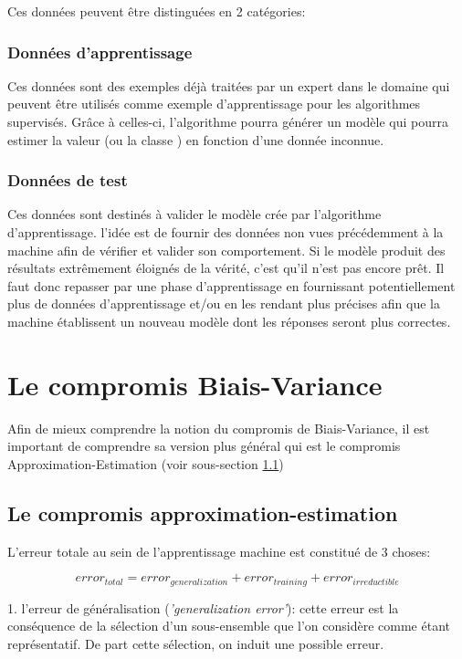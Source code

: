 \documentclass[a4paper]{article}
\begin{document}
Ces données peuvent être distinguées en 2 catégories:

\subsubsection{Données d'apprentissage}
Ces données sont des exemples déjà traitées par un expert dans le domaine qui peuvent être utilisés comme exemple d'apprentissage pour les algorithmes supervisés. Grâce à celles-ci, l'algorithme pourra générer un modèle qui pourra estimer la valeur (ou la classe ) en fonction d'une donnée inconnue.

\subsubsection{Données de test}
Ces données sont destinés à valider le modèle crée par l'algorithme d'apprentissage. l'idée est de fournir des données non vues précédemment à la machine afin de vérifier et valider son comportement. Si le modèle produit des résultats extrêmement éloignés de la vérité, c'est qu'il n'est pas encore prêt. Il faut donc repasser par une phase d'apprentissage en fournissant potentiellement plus de données d'apprentissage et/ou en les rendant plus précises afin que la machine établissent un nouveau modèle dont les réponses seront plus correctes.

\newpage

\section{Le compromis Biais-Variance}
\label{B-V}

Afin de mieux comprendre la notion du compromis de Biais-Variance, il est important de comprendre sa version plus général qui est le compromis Approximation-Estimation (voir sous-section \ref{A-E})

\subsection{Le compromis approximation-estimation}
\label{A-E}
L'erreur totale au sein de l'apprentissage machine est constitué de 3 choses: \newline

\[ error_{total} = error_{generalization} + error_{training} + error_{irreductible} \]

1. l'erreur de généralisation (\textit{'generalization error'}): cette erreur est la conséquence de la sélection d'un sous-ensemble que l'on considère comme étant représentatif. De part cette sélection, on induit une possible erreur.\newline
\end{document}
